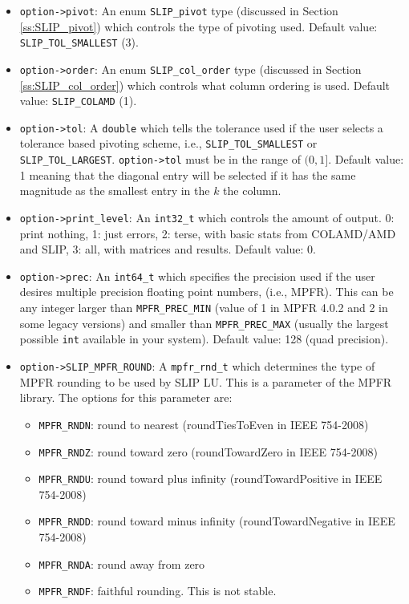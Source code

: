 \documentclass[12pt]{article}
\theoremstyle{definition}
\begin{document}
\begin{itemize}
\item
\verb|option->pivot|: An enum \verb|SLIP_pivot| type (discussed in Section
\ref{ss:SLIP_pivot}) which controls the type of pivoting used. Default value:
\verb|SLIP_TOL_SMALLEST| (3).

\item
\verb|option->order|: An enum \verb|SLIP_col_order| type (discussed in Section
\ref{ss:SLIP_col_order}) which controls what column ordering is used. Default
value: \verb|SLIP_COLAMD| (1).

\item
\verb|option->tol|: A \verb|double| which tells the tolerance used if the user
selects a tolerance based pivoting scheme, i.e., \verb|SLIP_TOL_SMALLEST| or
\verb|SLIP_TOL_LARGEST|. \verb|option->tol| must be in the range of $(0,1]$.
Default value: 1 meaning that the diagonal entry will be selected if it has the
same magnitude as the smallest entry in the $k$ the column.

\item
\verb|option->print_level|: An \verb|int32_t| which controls the amount of
output. 0: print nothing, 1: just errors, 2: terse, with basic stats from
COLAMD/AMD and SLIP, 3: all, with matrices and results. Default value: 0.

\item
\verb|option->prec|: An \verb|int64_t| which specifies the precision used if
the user desires multiple precision floating point numbers, (i.e., MPFR). This
can be any integer larger than \verb|MPFR_PREC_MIN| (value of 1 in MPFR 4.0.2
and 2 in some legacy versions) and smaller than \verb|MPFR_PREC_MAX| (usually
the largest possible \verb'int' available in your system). Default value: 128
(quad precision).

\item
\verb|option->SLIP_MPFR_ROUND|: A \verb|mpfr_rnd_t| which determines the type
of MPFR rounding to be used by SLIP LU. This is a parameter of the MPFR
library. The options for this parameter are:

    \begin{itemize}
        \item \verb|MPFR_RNDN|: round to nearest
            (roundTiesToEven in IEEE 754-2008)
        \item \verb|MPFR_RNDZ|: round toward zero
            (roundTowardZero in IEEE 754-2008)
        \item \verb|MPFR_RNDU|: round toward plus infinity
            (roundTowardPositive in IEEE 754-2008)
        \item \verb|MPFR_RNDD|: round toward minus infinity
            (roundTowardNegative in IEEE 754-2008)
        \item \verb|MPFR_RNDA|: round away from zero
        \item \verb|MPFR_RNDF|: faithful rounding. This is not stable.
    \end{itemize}


\end{itemize}
\end{document}
